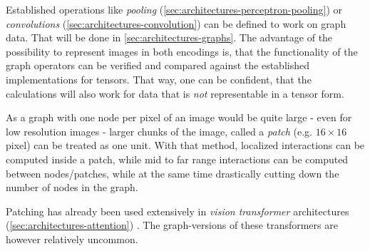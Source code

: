 Established operations like \emph{pooling} (\autoref{sec:architectures-perceptron-pooling}) or \emph{convolutions} (\autoref{sec:architectures-convolution}) can be defined to work on graph data. 
That will be done in \autoref{sec:architectures-graphs}. 
The advantage of the possibility to represent images in both encodings is, that the functionality of the graph operators can be verified and compared against the established implementations for tensors.
That way, one can be confident, that the calculations will also work for data that is \emph{not} representable in a tensor form.

As a graph with one node per pixel of an image would be quite large - even for low resolution images - larger chunks of the image, called a \emph{patch} (e.g. $16 \times 16$ pixel) can be treated as one unit. 
With that method, localized interactions can be computed inside a patch, while mid to far range interactions can be computed between nodes/patches, while at the same time drastically cutting down the number of nodes in the graph.

Patching has already been used extensively in \emph{vision transformer} architectures (\autoref{sec:architectures-attention}) \cite{dinoPaper, imageWorth16x16}. 
The graph-versions of these transformers are however relatively uncommon.

